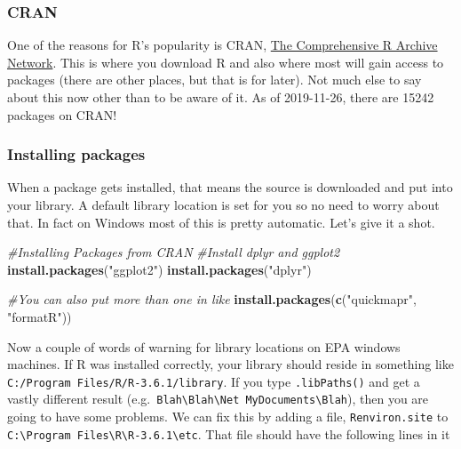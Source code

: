 \documentclass[]{article}
\newenvironment{Shaded}{\begin{snugshade}}{\end{snugshade}}
\newcommand{\CommentTok}[1]{\textcolor[rgb]{0.56,0.35,0.01}{\textit{#1}}}
\newcommand{\KeywordTok}[1]{\textcolor[rgb]{0.13,0.29,0.53}{\textbf{#1}}}
\newcommand{\NormalTok}[1]{#1}
\newcommand{\StringTok}[1]{\textcolor[rgb]{0.31,0.60,0.02}{#1}}
\begin{document}
\hypertarget{cran}{%
\subsubsection{CRAN}\label{cran}}

One of the reasons for R's popularity is CRAN,
\href{http://cran.r-project.org/}{The Comprehensive R Archive Network}.
This is where you download R and also where most will gain access to
packages (there are other places, but that is for later). Not much else
to say about this now other than to be aware of it. As of 2019-11-26,
there are 15242 packages on CRAN!

\hypertarget{installing-packages}{%
\subsubsection{Installing packages}\label{installing-packages}}

When a package gets installed, that means the source is downloaded and
put into your library. A default library location is set for you so no
need to worry about that. In fact on Windows most of this is pretty
automatic. Let's give it a shot.

\begin{Shaded}
\begin{Highlighting}[]
\CommentTok{#Installing Packages from CRAN}
\CommentTok{#Install dplyr and ggplot2}
\KeywordTok{install.packages}\NormalTok{(}\StringTok{"ggplot2"}\NormalTok{)}
\KeywordTok{install.packages}\NormalTok{(}\StringTok{"dplyr"}\NormalTok{)}

\CommentTok{#You can also put more than one in like}
\KeywordTok{install.packages}\NormalTok{(}\KeywordTok{c}\NormalTok{(}\StringTok{"quickmapr"}\NormalTok{, }\StringTok{"formatR"}\NormalTok{))}
\end{Highlighting}
\end{Shaded}

Now a couple of words of warning for library locations on EPA windows
machines. If R was installed correctly, your library should reside in
something like \texttt{C:/Program\ Files/R/R-3.6.1/library}. If you type
\texttt{.libPaths()} and get a vastly different result
(e.g.~\texttt{Blah\textbackslash{}Blah\textbackslash{}Net\ MyDocuments\textbackslash{}Blah}),
then you are going to have some problems. We can fix this by adding a
file, \texttt{Renviron.site} to
\texttt{C:\textbackslash{}Program\ Files\textbackslash{}R\textbackslash{}R-3.6.1\textbackslash{}etc}.
That file should have the following lines in it
\end{document}
